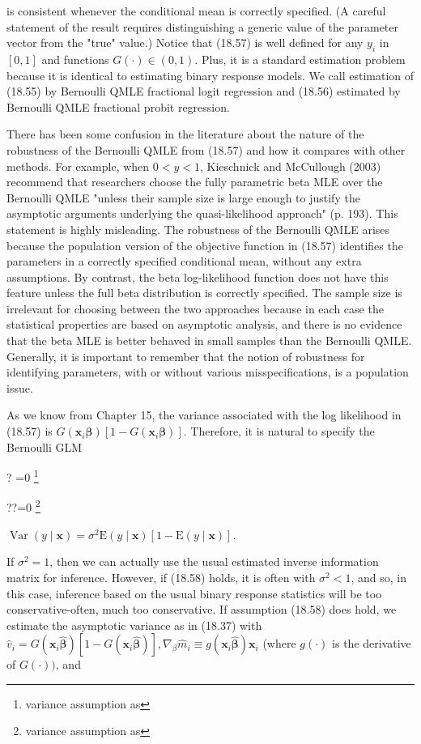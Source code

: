 \documentclass[10pt]{article}
\let\svthefootnote\thefootnote
\newcommand\blfootnotetext[1]{%
  \let\thefootnote\relax\footnote{#1}%
  \addtocounter{footnote}{-1}%
  \let\thefootnote\svthefootnote%
}
\let\svfootnotetext\footnotetext
\renewcommand\footnotetext[2][?]{%
  \if\relax#1\relax%
    \ifnum\value{footnote}=0\blfootnotetext{#2}\else\svfootnotetext{#2}\fi%
  \else%
    \if?#1\ifnum\value{footnote}=0\blfootnotetext{#2}\else\svfootnotetext{#2}\fi%
    \else\svfootnotetext[#1]{#2}\fi%
  \fi
}
\begin{document}
is consistent whenever the conditional mean is correctly specified. (A careful statement of the result requires distinguishing a generic value of the parameter vector from the "true" value.) Notice that (18.57) is well defined for any $y_{i}$ in $[0,1]$ and functions $G(\cdot) \in(0,1)$. Plus, it is a standard estimation problem because it is identical to estimating binary response models. We call estimation of (18.55) by Bernoulli QMLE fractional logit regression and (18.56) estimated by Bernoulli QMLE fractional probit regression.

There has been some confusion in the literature about the nature of the robustness of the Bernoulli QMLE from (18.57) and how it compares with other methods. For example, when $0<y<1$, Kieschnick and McCullough (2003) recommend that researchers choose the fully parametric beta MLE over the Bernoulli QMLE "unless their sample size is large enough to justify the asymptotic arguments underlying the quasi-likelihood approach" (p. 193). This statement is highly misleading. The robustness of the Bernoulli QMLE arises because the population version of the objective function in (18.57) identifies the parameters in a correctly specified conditional mean, without any extra assumptions. By contrast, the beta log-likelihood function does not have this feature unless the full beta distribution is correctly specified. The sample size is irrelevant for choosing between the two approaches because in each case the statistical properties are based on asymptotic analysis, and there is no evidence that the beta MLE is better behaved in small samples than the Bernoulli QMLE. Generally, it is important to remember that the notion of robustness for identifying parameters, with or without various misspecifications, is a population issue.

As we know from Chapter 15, the variance associated with the log likelihood in (18.57) is $G\left(\mathbf{x}_{i} \boldsymbol{\beta}\right)\left[1-G\left(\mathbf{x}_{i} \boldsymbol{\beta}\right)\right]$. Therefore, it is natural to specify the Bernoulli GLM

$\operatorname{Var}(y \mid \mathbf{x})=\sigma^{2} \mathrm{E}(y \mid \mathbf{x})[1-\mathrm{E}(y \mid \mathbf{x})]$.

If $\sigma^{2}=1$, then we can actually use the usual estimated inverse information matrix for inference. However, if (18.58) holds, it is often with $\sigma^{2}<1$, and so, in this case, inference based on the usual binary response statistics will be too conservative-often, much too conservative. If assumption (18.58) does hold, we estimate the asymptotic variance as in (18.37) with $\hat{v}_{i}=G\left(\mathbf{x}_{i} \hat{\boldsymbol{\beta}}\right)\left[1-G\left(\mathbf{x}_{i} \hat{\boldsymbol{\beta}}\right)\right], \nabla_{\beta} \hat{m}_{i} \equiv g\left(\mathbf{x}_{i} \hat{\boldsymbol{\beta}}\right) \mathbf{x}_{i}$ (where $g(\cdot)$ is the derivative of $G(\cdot))$, and
\end{document}
